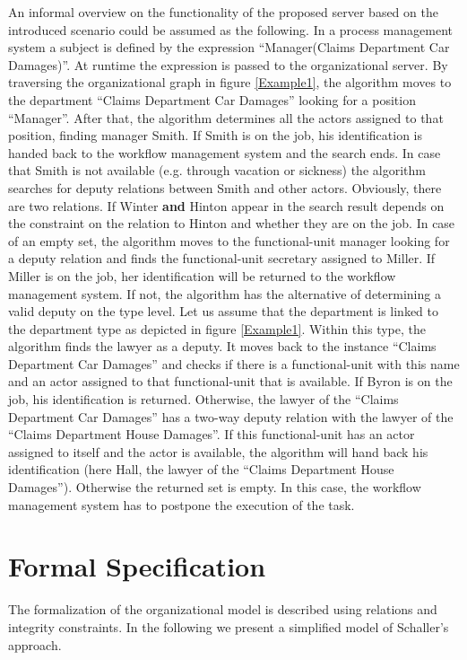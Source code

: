An informal overview on the functionality of the proposed server based on the introduced scenario could be assumed as the following. In a process management system a subject is defined by the expression  ``Manager(Claims Department Car Damages)''. At runtime the expression is passed to the organizational server. By traversing the organizational graph in figure \ref{Example1}, the algorithm moves to the department ``Claims Department Car Damages'' looking for a position ``Manager''. After that, the algorithm determines all the actors assigned to that position, finding manager Smith. If Smith is on the job, his identification is handed back to the workflow management system and the search ends. In case that Smith is not available (e.g. through vacation or sickness) the algorithm searches for  deputy relations between Smith and other actors. Obviously, there are two relations. If Winter \textbf{and} Hinton appear in the search result depends on the constraint on the relation to Hinton and whether they are on the job. In case of an empty set, the algorithm moves to the functional-unit manager looking 	for a deputy relation and finds the functional-unit secretary assigned to Miller. If Miller is on the job, her identification will be returned to the workflow management system. If not, the algorithm has the alternative of determining a valid deputy on the type level. Let us assume that the department is linked to the department type as depicted in figure \ref{Example1}. Within this type, the algorithm finds the lawyer as a deputy. It moves back to the instance ``Claims Department Car Damages'' and checks if there is a functional-unit with this name and an actor assigned to that functional-unit that is available. If Byron is on the job, his identification is returned. Otherwise, the lawyer of the ``Claims Department Car Damages'' has a two-way deputy relation with the lawyer of the ``Claims Department House Damages''. If this functional-unit has an actor assigned to itself and the actor is available, the algorithm will hand back his identification (here Hall, the lawyer of the ``Claims Department House Damages''). Otherwise the returned set is empty. In this case, the workflow management system has to postpone the execution of the task.


\section{Formal Specification}

The formalization of the organizational model is described using relations and integrity constraints. In the following we present a simplified model of Schaller's approach.

